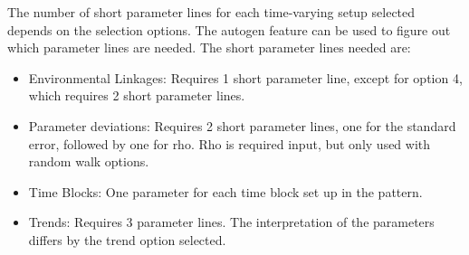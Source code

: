 The number of short parameter lines for each time-varying setup selected depends on the selection options. The autogen feature can be used to figure out which parameter lines are needed. The short parameter lines needed are:

\begin{itemize}
    \item Environmental Linkages: Requires 1 short parameter line, except for option 4, which requires 2 short parameter lines.
    \item Parameter deviations: Requires 2 short parameter lines, one for the standard error, followed by one for rho. Rho is required input, but only used with random walk options.
    \item Time Blocks: One parameter for each time block set up in the pattern.
    \item Trends: Requires 3 parameter lines. The interpretation of the parameters differs by the trend option selected.
\end{itemize}

